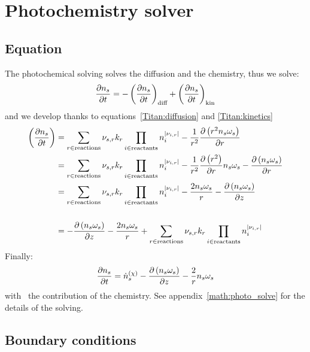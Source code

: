\section{Photochemistry solver}

\subsection{Equation}

The photochemical solving solves the diffusion and the chemistry, thus we solve:
\begin{equation}
\frac{\partial n_s}{\partial t} = - \left(\frac{\partial n_s}{\partial t}\right)_\text{diff} + \left(\frac{\partial n_s}{\partial t}\right)_\text{kin}
\end{equation}
and we develop thanks to equations~\ref{Titan:diffusion} and \ref{Titan:kinetics}
\begin{equation}
\begin{split}
\left(\frac{\partial n_s}{\partial t}\right) & = \sum_{r\in \text{reactions}} {\nu_{s,r}}k_{r} \prod_{i\in\text{reactants}}n_i^{|{\nu_{i,r}}|} -
                                     \frac{1}{r^2}\frac{\partial\left(r^2n_s\omega_s\right)}{\partial r} \\
                                 & = \sum_{r\in \text{reactions}} {\nu_{s,r}} k_r\prod_{i\in\text{reactants}}n_i^{|{\nu_{i,r}}|} -
                                     \frac{1}{r^2}\frac{\partial\left(r^2\right)}{\partial r}n_s\omega_s - \frac{\partial\left(n_s\omega_s\right)}{\partial r} \\
                                 & = \sum_{r\in \text{reactions}} {\nu_{s,r}} k_{r}\prod_{i\in\text{reactants}}n_i^{|{\nu_{i,r}}|} -
                                     \frac{2n_s\omega_s}{r} - \frac{\partial\left(n_s\omega_s\right)}{\partial z} \\[\baselineskip]
                                 & = - \frac{\partial\left(n_s\omega_s\right)}{\partial z} - \frac{2n_s\omega_s}{r} + \sum_{r\in \text{reactions}} {\nu_{s,r}} k_{r}\prod_{i\in\text{reactants}}n_i^{|{\nu_{i,r}}|} 
\end{split}
\end{equation}
Finally:
\begin{equation}
\frac{\partial n_s}{\partial t} = \dot{n}^{(\chi)}_s - \frac{\partial\left(n_s\omega_s\right)}{\partial z} - \frac{2}{r}n_s\omega_s
\label{Titan:photochem_eq}
\end{equation}
with \omegadot\ the contribution of the chemistry.
See appendix~\ref{math:photo_solve} for the details of the solving.

\subsection{Boundary conditions}

